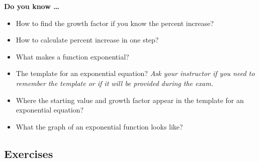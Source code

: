 
 

\noindent \textbf{Do you know \ldots}

\begin{itemize}  
\item How to find the growth factor if you know the percent increase?    
\item How to calculate percent increase in one step?   
\item What makes a function exponential?   
\item The template for an exponential equation? \emph{Ask your instructor if you need to remember the template or if it will be provided during the exam.} 
\item Where the starting value and growth factor appear in the template for an exponential equation?   
\item What the graph of an exponential function looks like? 
  
\end{itemize}

\subsection*{Exercises}

